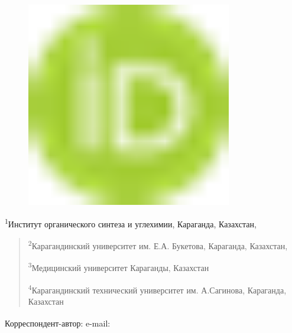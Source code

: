 \begin{figure}[H]
	\centering
	\includegraphics[width=0.8\textwidth]{media/chem2/image1}
	\caption*{}
\end{figure}


\textsuperscript{1}Институт органического синтеза и углехимии,
Караганда, Казахстан,

\begin{quote}
\textsuperscript{2}Карагандинский университет им. Е.А. Букетова,
Караганда, Казахстан,

\textsuperscript{3}Медицинский университет Караганды, Казахстан

\textsuperscript{4}Карагандинский технический университет им.
А.Сагинова, Караганда, Казахстан
\end{quote}

{\bfseries \textsuperscript{\envelope }}Корреспондент-автор: e-mail:
\href{mailto:iosu8990@mail.ru}{}

